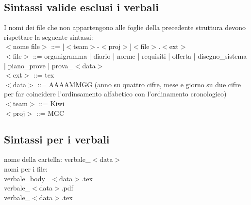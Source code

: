 \subsection{Sintassi valide esclusi i verbali}
I nomi dei file che non appartengono alle foglie della precedente struttura
devono rispettare la seguente sintassi: \\ 
$<$nome file$>$ ::= [$<$team$>$-$<$proj$>$]$<$file$>$.$<$ext$>$ \\
$<$file$>$ ::= organigramma | diario | norme | requisiti | offerta | disegno\_sistema | piano\_prove | prova\_$<$data$>$ \\
$<$ext$>$ ::= tex \\
$<$data$>$ ::= AAAAMMGG (anno su quattro cifre, mese e giorno su due cifre per
 far coincidere l'ordinsamento alfabetico con l'ordinamento cronologico) \\
$<$team$>$ ::= Kiwi\\
$<$proj$>$ ::= MGC

\subsection{Sintassi per i verbali}
nome della cartella: verbale\_$<$data$>$ \\
nomi per i file:\\
verbale\_body\_$<$data$>$.tex\\
verbale\_$<$data$>$.pdf \\
verbale\_$<$data$>$.tex 
